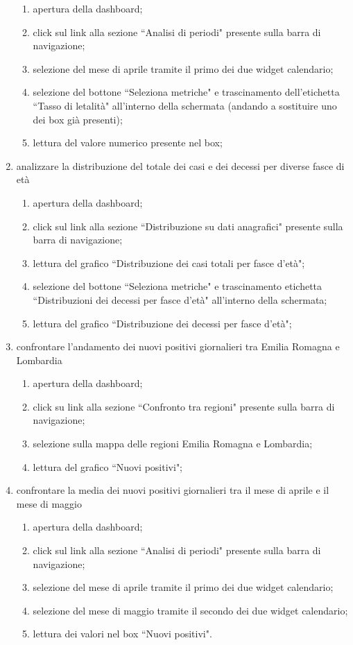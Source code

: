 \begin{enumerate}
    \begin{enumerate}
        \item apertura della dashboard;
        \item click sul link alla sezione ``Analisi di periodi" presente sulla barra di navigazione;
        \item selezione del mese di aprile tramite il primo dei due widget calendario;
        \item selezione del bottone ``Seleziona metriche" e trascinamento dell'etichetta ``Tasso di letalità" all'interno della schermata (andando a sostituire uno dei box già presenti);
        \item lettura del valore numerico presente nel box;
    \end{enumerate}
    \item analizzare la distribuzione del totale dei casi e dei decessi per diverse fasce di età
    \begin{enumerate}
        \item apertura della dashboard;
        \item click sul link alla sezione ``Distribuzione su dati anagrafici" presente sulla barra di navigazione;
        \item lettura del grafico ``Distribuzione dei casi totali per fasce d’età";
        \item selezione del bottone ``Seleziona metriche" e trascinamento etichetta ``Distribuzioni dei decessi per fasce d'età" all'interno della schermata;
        \item lettura del grafico ``Distribuzione dei decessi per fasce d'età";
    \end{enumerate}
    \item confrontare l'andamento dei nuovi positivi giornalieri tra Emilia Romagna e Lombardia
    \begin{enumerate}
        \item apertura della dashboard;
        \item click su link alla sezione ``Confronto tra regioni" presente sulla barra di navigazione;
        \item selezione sulla mappa delle regioni Emilia Romagna e Lombardia;
        \item lettura del grafico ``Nuovi positivi";
    \end{enumerate}
    \item confrontare la media dei nuovi positivi giornalieri tra il mese di aprile e il mese di maggio
    \begin{enumerate}
        \item apertura della dashboard;
        \item click sul link alla sezione ``Analisi di periodi" presente sulla barra di navigazione;
        \item selezione del mese di aprile tramite il primo dei due widget calendario;
        \item selezione del mese di maggio tramite il secondo dei due widget calendario;
        \item lettura dei valori nel box ``Nuovi positivi".
    \end{enumerate}
\end{enumerate}
